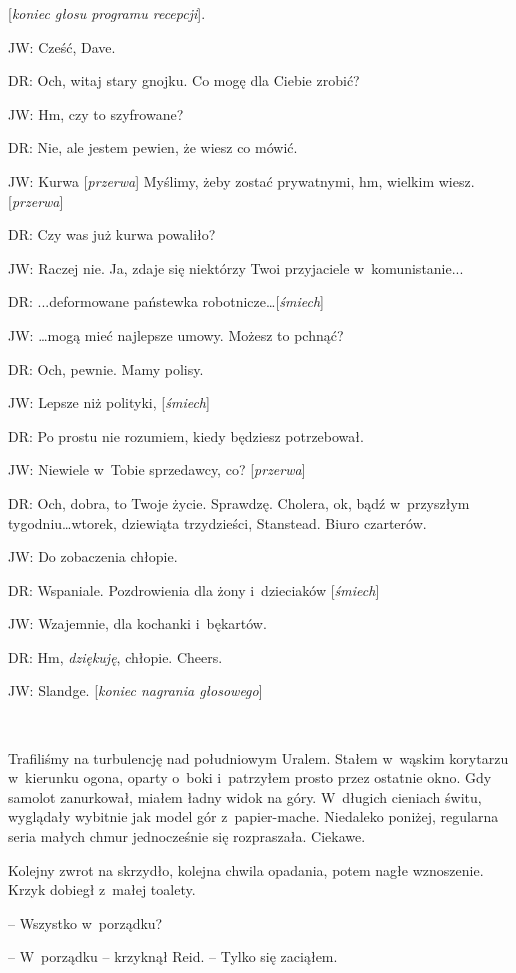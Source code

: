 \documentclass[oneside,polish,11pt,sfheadings]{mwbk}
\begin{document}
{[}\emph{koniec głosu programu recepcji}{]}.

JW: Cześć, Dave.

DR: Och, witaj stary gnojku. Co mogę dla Ciebie zrobić?

JW: Hm, czy to szyfrowane?

DR: Nie, ale jestem pewien, że wiesz co mówić.

JW: Kurwa {[}\emph{przerwa}{]} Myślimy, żeby zostać prywatnymi, hm,
wielkim wiesz. {[}\emph{przerwa}{]}

DR: Czy was już kurwa powaliło?

JW: Raczej nie. Ja, zdaje się niektórzy Twoi przyjaciele w~komunistanie...

DR: ...deformowane państewka robotnicze\ldots {[}\emph{śmiech}{]}

JW: \ldots mogą mieć najlepsze umowy. Możesz to pchnąć?

DR: Och, pewnie. Mamy polisy.

JW: Lepsze niż polityki, {[}\emph{śmiech}{]}

DR: Po prostu nie rozumiem, kiedy będziesz potrzebował.

JW: Niewiele w~Tobie sprzedawcy, co? {[}\emph{przerwa}{]}

DR: Och, dobra, to Twoje życie. Sprawdzę. Cholera, ok, bądź w~przyszłym
tygodniu\ldots wtorek, dziewiąta trzydzieści, Stanstead. Biuro czarterów.

JW: Do zobaczenia chłopie.

DR: Wspaniale. Pozdrowienia dla żony i~dzieciaków {[}\emph{śmiech}{]}

JW: Wzajemnie, dla kochanki i~bękartów.

DR: Hm, \emph{dziękuję}, chłopie. Cheers.

JW: Slandge. {[}\emph{koniec nagrania głosowego}{]}

~

Trafiliśmy na turbulencję nad południowym Uralem. Stałem w~wąskim
korytarzu w~kierunku ogona, oparty o~boki i~patrzyłem prosto przez
ostatnie okno. Gdy samolot zanurkował, miałem ładny widok na góry. W~długich cieniach świtu, wyglądały wybitnie jak model gór z~papier-mache.
Niedaleko poniżej, regularna seria małych chmur jednocześnie się
rozpraszała. Ciekawe.

Kolejny zwrot na skrzydło, kolejna chwila opadania, potem nagłe
wznoszenie. Krzyk dobiegł z~małej toalety.

-- Wszystko w~porządku?

-- W~porządku -- krzyknął Reid. -- Tylko się zaciąłem.
\end{document}
